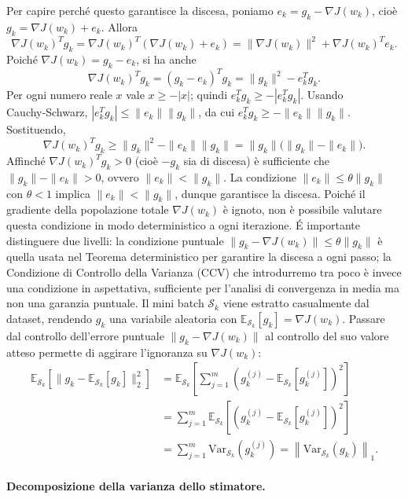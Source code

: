 \documentclass[a4paper,12pt]{article}
\newcommand{\E}{\mathbb{E}}
\begin{document}
Per capire perch\'e questo garantisce la discesa, poniamo $e_k = g_k - \nabla J(w_k)$, cio\`e $g_k = \nabla J(w_k) + e_k$. Allora
\[
\nabla J(w_k)^T g_k = \nabla J(w_k)^T(\nabla J(w_k) + e_k) = \|\nabla J(w_k)\|^2 + \nabla J(w_k)^T e_k.
\]
Poich\'e $\nabla J(w_k) = g_k - e_k$, si ha anche
\[
\nabla J(w_k)^T g_k = (g_k - e_k)^T g_k = \|g_k\|^2 - e_k^T g_k.
\]
Per ogni numero reale $x$ vale $x \ge -|x|$; quindi $e_k^T g_k \ge -|e_k^T g_k|$. Usando Cauchy‑Schwarz, $|e_k^T g_k| \le \|e_k\|\|g_k\|$, da cui $e_k^T g_k \ge -\|e_k\|\|g_k\|$. Sostituendo,
\[
\nabla J(w_k)^T g_k \ge \|g_k\|^2 - \|e_k\|\|g_k\| = \|g_k\|\bigl(\|g_k\| - \|e_k\|\bigr).
\]
Affinch\'e $\nabla J(w_k)^T g_k > 0$ (cio\`e $-g_k$ sia di discesa) \`e sufficiente che $\|g_k\| - \|e_k\| > 0$, ovvero $\|e_k\| < \|g_k\|$. La condizione $\|e_k\| \le \theta \|g_k\|$ con $\theta < 1$ implica $\|e_k\| < \|g_k\|$, dunque garantisce la discesa.
\newpage
Poich\'e il gradiente della popolazione totale $\nabla J(w_k)$ \`e ignoto, non \`e possibile valutare questa condizione in modo deterministico a ogni iterazione. \'E importante distinguere due livelli: la condizione puntuale $\|g_k - \nabla J(w_k)\| \le \theta\|g_k\|$ \`e quella usata nel Teorema deterministico per garantire la discesa a ogni passo; la Condizione di Controllo della Varianza (CCV) che introdurremo tra poco \`e invece una condizione in aspettativa, sufficiente per l'analisi di convergenza in media ma non una garanzia puntuale. Il mini batch $\mathcal{S}_k$ viene estratto casualmente dal dataset, rendendo $g_k$ una variabile aleatoria con $\E_{\mathcal{S}_k}[g_k] = \nabla J(w_k)$. Passare dal controllo dell'errore puntuale $\|g_k - \nabla J(w_k)\|$ al controllo del suo valore atteso permette di aggirare l'ignoranza su $\nabla J(w_k)$:
\begin{align*}
\mathbb{E}_{\mathcal{S}_k}\left[\|g_k - \mathbb{E}_{\mathcal{S}_k}[g_k]\|_2^2\right]
&= \mathbb{E}_{\mathcal{S}_k}\left[\sum_{j=1}^{m} \left(g_k^{(j)} - \mathbb{E}_{\mathcal{S}_k}[g_k^{(j)}]\right)^2\right] \\
&= \sum_{j=1}^{m} \mathbb{E}_{\mathcal{S}_k}\left[\left(g_k^{(j)} - \mathbb{E}_{\mathcal{S}_k}[g_k^{(j)}]\right)^2\right] \\
&= \sum_{j=1}^{m} \mathrm{Var}_{\mathcal{S}_k}\left(g_k^{(j)}\right)
= \left\|\mathrm{Var}_{\mathcal{S}_k}(g_k)\right\|_1.
\end{align*}

\paragraph{Decomposizione della varianza dello stimatore.}
\end{document}
